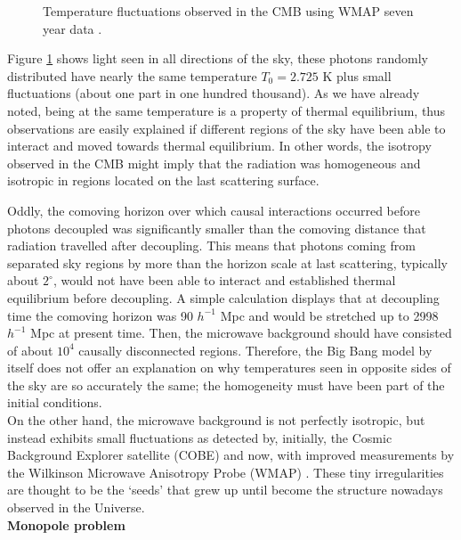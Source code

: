 \documentclass{rmaa}
\begin{document}
\begin{figure}[ht] 
\centerline{ \epsfxsize=210pt  }
\caption{Temperature fluctuations observed in the CMB using 
 WMAP  seven year data \citep{Gold}. }
\label{fig:wmap5}
\end{figure}

Figure \ref{fig:wmap5} shows light seen in all directions of the sky, 
these photons randomly distributed have nearly the same temperature $T_0= 2.725$ K 
plus small fluctuations (about one part in one hundred thousand).
 As we have already noted, being at the same 
temperature is a property of thermal equilibrium, thus observations are easily explained 
if different regions of the sky have been able to interact and moved towards thermal 
equilibrium. In other words, the isotropy observed in the CMB might imply that the radiation was 
homogeneous and isotropic in regions located on the last scattering surface.

Oddly, the comoving horizon over which causal interactions occurred before  
photons decoupled was significantly smaller than the comoving distance 
that radiation travelled after decoupling.
This means that photons coming from separated sky regions by more than the
horizon scale at last scattering, typically about $2^\circ$, would not 
have been  able to interact and established thermal equilibrium before decoupling. 
A simple calculation displays that at decoupling time the comoving horizon was
90 $h^{-1}$ Mpc and would be stretched up to 2998 $h^{-1}$ Mpc at present time.
Then, the microwave background should have consisted of about $10^4$ causally 
disconnected regions.  
Therefore, the Big Bang model by itself does not offer an explanation on why
temperatures seen in opposite sides of the sky are so accurately the same; the homogeneity
must have been part of the initial conditions. 
\\

On the other hand, the microwave background is not perfectly isotropic, but instead exhibits
small fluctuations as detected by, initially, the Cosmic Background Explorer satellite (COBE) \citep{Smooth} and 
now, with improved measurements by the Wilkinson Microwave Anisotropy Probe (WMAP)
\citep{wmap5, Larson}. These tiny irregularities are thought to be the `seeds' that grew 
up until become the structure nowadays observed in the Universe. 
\\


\vskip 16pt
\textbf{Monopole problem} 
\vskip 10pt
\end{document}
